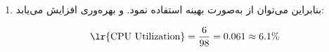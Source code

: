 \begin{qsolve}
\begin{enumerate}
		
	\end{enumerate}
\end{qsolve}


\begin{qsolve}
	\begin{enumerate}
		\item [ ]
		بنابراین می‌توان از  به‌صورت بهینه استفاده نمود. و بهره‌وری  افزایش می‌یابد:
		
		$$ \text{\lr{CPU Utilization}} = \frac{6}{98}=0.061\approx 6.1 \% $$
		
	\end{enumerate}
\end{qsolve}